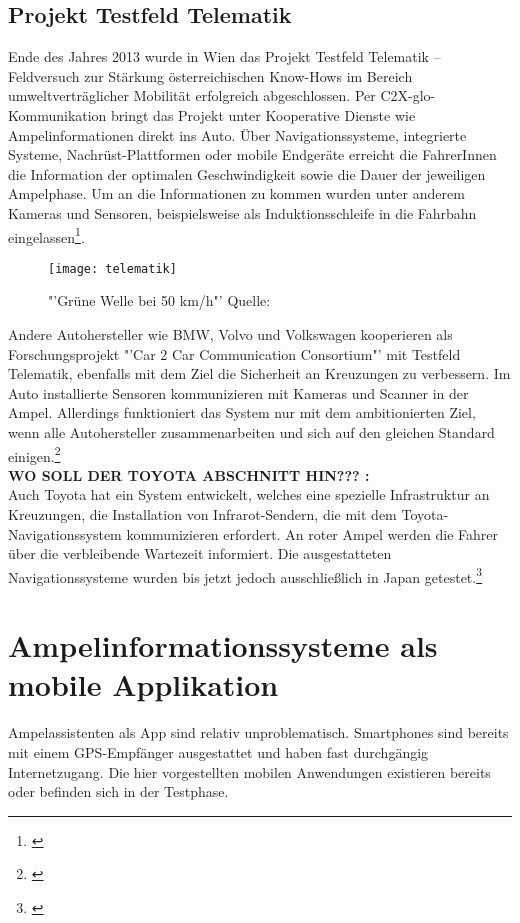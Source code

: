 \subsection{Projekt Testfeld Telematik}
Ende des Jahres 2013 wurde in Wien das Projekt Testfeld Telematik -- Feldversuch zur Stärkung österreichischen Know-Hows im Bereich umweltverträglicher Mobilität erfolgreich abgeschlossen. Per \gls{C2X-glo}-Kommunikation bringt das Projekt unter Kooperative Dienste wie Ampelinformationen direkt ins Auto. Über Navigationssysteme, integrierte Systeme, Nachrüst-Plattformen oder mobile Endgeräte erreicht die FahrerInnen die Information der optimalen Geschwindigkeit sowie die Dauer der jeweiligen Ampelphase. Um an die Informationen zu kommen wurden unter anderem Kameras und Sensoren, beispielsweise als Induktionsschleife in die Fahrbahn eingelassen\footnote{\cite{Siemens}}.
\begin{figure}[H]
    \centering
    \texttt{[image: telematik]} \label{fig:telematik}
    \caption[Projekt Testfeld-Telematik Ampelinformation]{"'Grüne Welle bei 50 km/h"'  Quelle: \cite{Telematik}}
\end{figure}
Andere Autohersteller wie \gls{BMW}, Volvo und Volkswagen kooperieren als Forschungsprojekt "'Car 2 Car Communication Consortium"' mit Testfeld Telematik, ebenfalls mit dem Ziel die Sicherheit an Kreuzungen zu verbessern. Im Auto installierte Sensoren kommunizieren mit Kameras und Scanner in der Ampel. Allerdings funktioniert das System nur mit dem ambitionierten Ziel, wenn alle Autohersteller zusammenarbeiten und sich auf den gleichen Standard einigen.\footnote{\cite{Siemens}}
\\ \textbf{WO SOLL DER TOYOTA ABSCHNITT HIN??? :} \\
Auch Toyota hat ein System entwickelt, welches eine spezielle Infrastruktur an Kreuzungen, die Installation von Infrarot-Sendern, die mit dem Toyota-Navigationssystem kommunizieren erfordert. An roter Ampel werden die Fahrer über die verbleibende Wartezeit informiert. Die ausgestatteten Navigationssysteme wurden bis jetzt jedoch ausschließlich in Japan getestet.\footnote{\cite{Toyota}}
%
%
\section{Ampelinformationssysteme als mobile Applikation}
Ampelassistenten als App sind relativ unproblematisch. Smartphones sind bereits mit einem \gls{GPS}-Empfänger ausgestattet und haben fast durchgängig Internetzugang. Die hier vorgestellten mobilen Anwendungen existieren bereits oder befinden sich in der Testphase.
